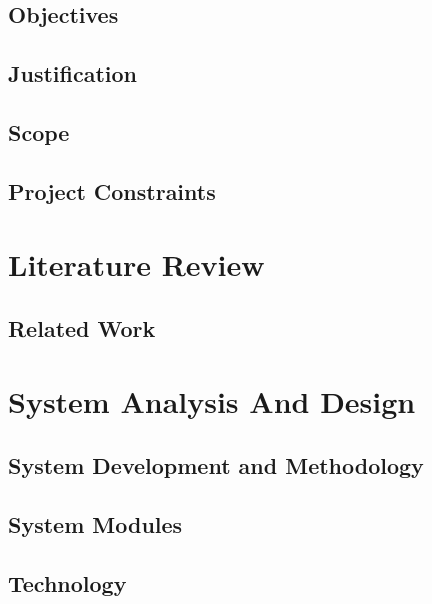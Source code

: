 \documentclass{report}
\begin{document}
\section{Objectives}


\section{Justification}


\section{Scope}


\section{Project Constraints}



\chapter{Literature Review}

\section{Related Work}


\chapter{System Analysis And Design}

\section{System Development and Methodology}


\section{System Modules}


\section{Technology}






\nocite{*}



\end{document}

